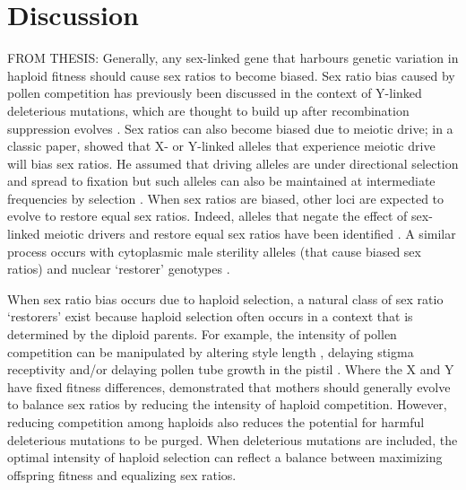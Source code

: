 \documentclass[12pt]{article}
\begin{document}


\linenumbers
\modulolinenumbers[2]

\section*{Discussion}


{\color{blue}
FROM THESIS:
Generally, any sex-linked gene that harbours genetic variation in haploid fitness should cause sex ratios to become biased. 
Sex ratio bias caused by pollen competition has previously been discussed in the context of Y-linked deleterious mutations, which are thought to build up after recombination suppression evolves \citep{Lloyd:1974tz,Stehlik:2005ul}. 
Sex ratios can also become biased due to meiotic drive;
in a classic paper, \citet{Hamilton:1967ts} showed that X- or Y-linked alleles that experience meiotic drive will bias sex ratios. 
He assumed that driving alleles are under directional selection and spread to fixation but such alleles can also be maintained at intermediate frequencies by selection \citep{Feldman:1989gm,Holman:2015en}. 
When sex ratios are biased, other loci are expected to evolve to restore equal sex ratios. 
Indeed, alleles that negate the effect of sex-linked meiotic drivers and restore equal sex ratios have been identified \citep{Stalker:1961th,Smith:1975ft}. 
A similar process occurs with cytoplasmic male sterility alleles (that cause biased sex ratios) and nuclear `restorer' genotypes \citep{Frank:1989vl}. 

When sex ratio bias occurs due to haploid selection, a natural class of sex ratio `restorers' exist because haploid selection often occurs in a context that is determined by the diploid parents. 
For example, the intensity of pollen competition can be manipulated by altering style length \citep{Travers:2001,Lankinen:2001gc,Ruane:2009vt}, delaying stigma receptivity \citep{Galen:1986wq,Lankinen:2011if} and/or delaying pollen tube growth in the pistil \citep{Herrero:2003jf}. 
Where the X and Y have fixed fitness differences, \citet{Hough:2013uo} demonstrated that mothers should generally evolve to balance sex ratios by reducing the intensity of haploid competition. 
However, reducing competition among haploids also reduces the potential for harmful deleterious mutations to be purged. 
When deleterious mutations are included, the optimal intensity of haploid selection can reflect a balance between maximizing offspring fitness and equalizing sex ratios. 

}
\end{document}
